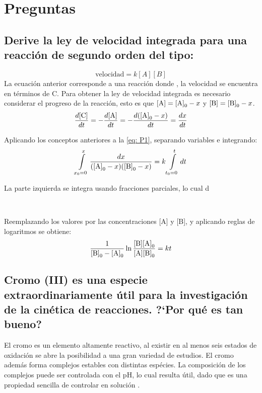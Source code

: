 \documentclass[fleqn,10pt]{SelfArx} %
\begin{document}
	\section{Preguntas}
	\subsection[Derive la ley de velocidad]{Derive la ley de velocidad integrada para una reacci\'on de segundo orden del tipo:}
	\begin{equation}\label{eq: P1}
	    \text{velocidad}=k[A][B]
	\end{equation}
	La ecuaci\'on anterior corresponde a una reacci\'on donde , la velocidad se encuentra en t\'erminos de C. Para obtener la ley de velocidad integrada es necesario considerar el progreso de la reacci\'on, esto es que $\ce{[A]} = \ce{[A]_0} - x$ y $\ce{[B]} = \ce{[B]_0}-x$.
	\begin{equation}
	    \dfrac{d\ce{[C]}}{dt}=-\dfrac{d\ce{[A]}}{dt}=-\dfrac{d(\ce{[A]_0} - x)}{dt} = \dfrac{dx}{dt}
	\end{equation}
	
	Aplicando los conceptos anteriores a la \autoref{eq: P1}, separando variables e integrando:
	\begin{equation}
	    \int\limits_{x_0=0}^{x} \dfrac{dx}{(\ce{[A]_0} - x)(\ce{[B]_0} - x)} = k\int\limits_{t_0=0}^{t} dt
	\end{equation}
	
	La parte izquierda se integra usando fracciones parciales, lo cual d
	
	
	
	\begin{equation}
	
	
	    \dfrac{}{}
	    
	\end{equation}
	
	
	
	\normalsize
	
	
	Reemplazando los valores por las concentraciones [A] y [B], y aplicando reglas de logaritmos se obtiene:
	\begin{equation}
	    \dfrac{1}{\ce{[B]_0}-\ce{[A]_0}}\ln\dfrac{\ce{[B][A]_0}}{\ce{[A][B]_0}} = kt
	\end{equation}
	
	\subsection[Cromo (III)]{Cromo (III) es una especie extraordinariamente \'util para la investigaci\'on de la cin\'etica de reacciones. ?`Por qu\'e es tan bueno?}
	El cromo es un elemento altamente reactivo, al existir en al menos seis estados de oxidaci\'on se abre la posibilidad a una gran variedad de estudios. El cromo adem\'as forma complejos estables con distintas esp\'ecies. La composici\'on de los complejos puede ser controlada con el pH, lo cual resulta \'util, dado que es una propiedad sencilla de controlar en soluci\'on \cite{Frost}.
	
\end{document}
